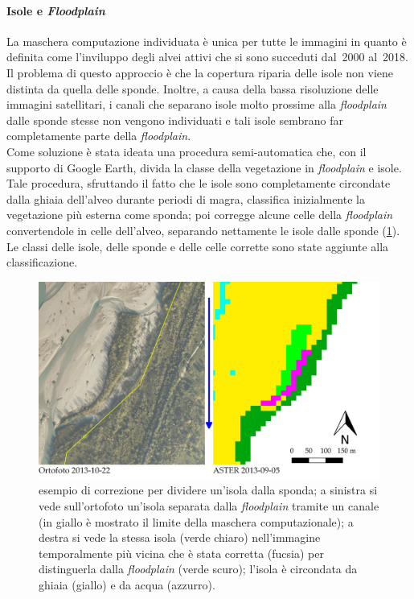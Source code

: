 \paragraph{Isole e \emph{Floodplain}}
La maschera computazione individuata è unica per tutte le immagini in quanto è definita come l'inviluppo degli alvei attivi che si sono succeduti dal~2000 al~2018.
Il problema di questo approccio è che la copertura riparia delle isole non viene distinta da quella delle sponde.
Inoltre, a causa della bassa risoluzione delle immagini satellitari, i canali che separano isole molto prossime alla \emph{floodplain} dalle sponde stesse non vengono individuati e tali isole sembrano far completamente parte della \emph{floodplain}.
\\ 
Come soluzione è stata ideata una procedura semi-automatica che, con il supporto di Google Earth, divida la classe della vegetazione in \emph{floodplain} e isole. 
Tale procedura, sfruttando il fatto che le isole sono completamente circondate dalla ghiaia dell'alveo durante periodi di magra, classifica inizialmente la vegetazione più esterna come sponda;
poi corregge alcune celle della \emph{floodplain} convertendole in celle dell'alveo, separando nettamente le isole dalle sponde (\cref{fig:isola-divisa-floodplain}).
Le classi delle isole, delle sponde e delle celle corrette sono state aggiunte alla classificazione.
%
\begin{figure}
	\centering
	\includegraphics[width = \textwidth]{files/isola_divisa_floodplain.jpeg}
	\caption[esempio di correzione per dividere un'isola dalla sponda]{esempio di correzione per dividere un'isola dalla sponda; a sinistra si vede sull'ortofoto un'isola separata dalla \emph{floodplain} tramite un canale (in giallo è mostrato il limite della maschera computazionale); a destra si vede la stessa isola (verde chiaro) nell'immagine \AST{} temporalmente più vicina che è stata corretta (fucsia) per distinguerla dalla \emph{floodplain} (verde scuro); l'isola è circondata da ghiaia (giallo) e da acqua (azzurro).}
	\label{fig:isola-divisa-floodplain}
\end{figure}
%
%
%
